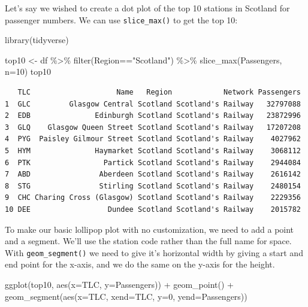 \documentclass[
  letterpaper,
  DIV=11,
  numbers=noendperiod]{scrreprt}
\newenvironment{Shaded}{\begin{snugshade}}{\end{snugshade}}
\newcommand{\AttributeTok}[1]{\textcolor[rgb]{0.40,0.45,0.13}{#1}}
\newcommand{\DecValTok}[1]{\textcolor[rgb]{0.68,0.00,0.00}{#1}}
\newcommand{\FunctionTok}[1]{\textcolor[rgb]{0.28,0.35,0.67}{#1}}
\newcommand{\NormalTok}[1]{\textcolor[rgb]{0.00,0.23,0.31}{#1}}
\newcommand{\OtherTok}[1]{\textcolor[rgb]{0.00,0.23,0.31}{#1}}
\newcommand{\SpecialCharTok}[1]{\textcolor[rgb]{0.37,0.37,0.37}{#1}}
\newcommand{\StringTok}[1]{\textcolor[rgb]{0.13,0.47,0.30}{#1}}
\begin{document}
Let's say we wished to create a dot plot of the top 10 stations in
Scotland for passenger numbers. We can use \texttt{slice\_max()} to get
the top 10:

\begin{Shaded}
\begin{Highlighting}[]
\FunctionTok{library}\NormalTok{(tidyverse)}

\NormalTok{top10 }\OtherTok{\textless{}{-}}\NormalTok{ df }\SpecialCharTok{\%\textgreater{}\%} \FunctionTok{filter}\NormalTok{(Region}\SpecialCharTok{==}\StringTok{"Scotland"}\NormalTok{) }\SpecialCharTok{\%\textgreater{}\%} \FunctionTok{slice\_max}\NormalTok{(Passengers, }\AttributeTok{n=}\DecValTok{10}\NormalTok{)}
\NormalTok{top10}
\end{Highlighting}
\end{Shaded}

\begin{verbatim}
   TLC                    Name   Region            Network Passengers
1  GLC         Glasgow Central Scotland Scotland's Railway   32797088
2  EDB               Edinburgh Scotland Scotland's Railway   23872996
3  GLQ    Glasgow Queen Street Scotland Scotland's Railway   17207208
4  PYG  Paisley Gilmour Street Scotland Scotland's Railway    4027962
5  HYM               Haymarket Scotland Scotland's Railway    3068112
6  PTK                 Partick Scotland Scotland's Railway    2944084
7  ABD                Aberdeen Scotland Scotland's Railway    2616142
8  STG                Stirling Scotland Scotland's Railway    2480154
9  CHC Charing Cross (Glasgow) Scotland Scotland's Railway    2229356
10 DEE                  Dundee Scotland Scotland's Railway    2015782
\end{verbatim}

To make our basic lollipop plot with no customization, we need to add a
point and a segment. We'll use the station code rather than the full
name for space. With \texttt{geom\_segment()} we need to give it's
horizontal width by giving a start and end point for the x-axis, and we
do the same on the y-axis for the height.

\begin{Shaded}
\begin{Highlighting}[]
\FunctionTok{ggplot}\NormalTok{(top10, }\FunctionTok{aes}\NormalTok{(}\AttributeTok{x=}\NormalTok{TLC, }\AttributeTok{y=}\NormalTok{Passengers)) }\SpecialCharTok{+}
  \FunctionTok{geom\_point}\NormalTok{() }\SpecialCharTok{+} 
  \FunctionTok{geom\_segment}\NormalTok{(}\FunctionTok{aes}\NormalTok{(}\AttributeTok{x=}\NormalTok{TLC, }\AttributeTok{xend=}\NormalTok{TLC, }\AttributeTok{y=}\DecValTok{0}\NormalTok{, }\AttributeTok{yend=}\NormalTok{Passengers))}
\end{Highlighting}
\end{Shaded}
\end{document}
